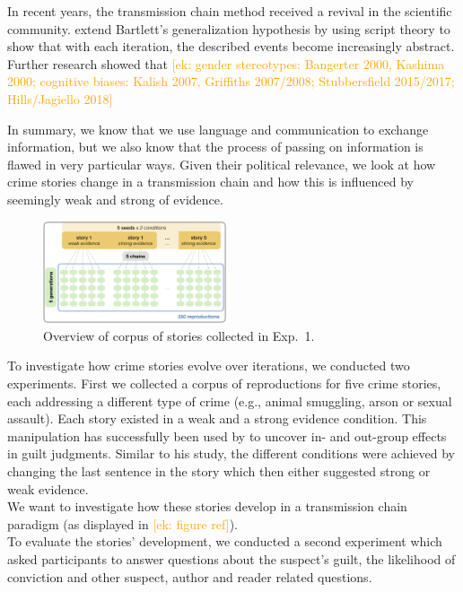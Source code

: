 \documentclass[10pt,letterpaper]{article}
\newcommand{\ek}[1]{\textcolor{Orange}{[ek: #1]}}
\begin{document}
In recent years, the transmission chain method received a revival in the scientific community.  extend Bartlett's generalization hypothesis by using script theory to show that with each iteration, the described events become increasingly abstract. Further research showed that \ek{gender stereotypes: Bangerter 2000, Kashima 2000; cognitive biases: Kalish 2007, Griffiths 2007/2008; Stubbersfield 2015/2017; Hills/Jagiello 2018}

In summary, we know that we use language and communication to exchange information, but we also know that the process of passing on information is flawed in very particular ways. Given their political relevance, we look at how crime stories change in a transmission chain and how this is influenced by seemingly weak and strong of evidence.

\begin{figure}[]
	\includegraphics[width=0.48\textwidth]{graphs/corpus_overview.png}
	\caption{Overview of corpus of stories collected in Exp.~1.} 
	\label{fig:design}
\end{figure}

To investigate how crime stories evolve over iterations, we conducted two experiments. First we collected a corpus of reproductions for five crime stories, each addressing a different type of crime (e.g., animal smuggling, arson or sexual assault). Each story existed in a weak and a strong evidence condition. This manipulation has successfully been used by \cite{Van-Prooijen:2006} to uncover in- and out-group effects in guilt judgments. Similar to his study, the different conditions were achieved by changing the last sentence in the story which then either suggested strong or weak evidence. \\
We want to investigate how these stories develop in a transmission chain paradigm (as displayed in \ek{figure ref}).\\
To evaluate the stories' development, we conducted a second experiment which asked participants to answer questions about the suspect's guilt, the likelihood of conviction and other suspect, author and reader related questions. 
\end{document}
